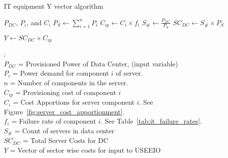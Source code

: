   \begin{algorithm}
    \caption{IT equipment Y vector algorithm}
    \begin{algorithmic}
      \REQUIRE $P_{DC}$, $P_{i}$, and $C_i$
      \STATE $P_{S} \gets \sum\limits_{i=1}^n P_{i}$
      \STATE $C_{ip} \gets C_i \times f_i$
      \STATE $S_\# \gets \frac{P_{DC}}{P_{S}}$
      \STATE $SC_{DC} \gets S_\# \times P_{S}$
      
      \vspace{.1in}
      \RETURN $Y \gets SC_{DC} \times C_{ip}$
      
      \vspace{.1in}
      : \\
        \hspace{.2in}$P_{DC}$ = Provisioned Power of Data Center, (input variable) \\
        \hspace{.2in}$P_{i}$ = Power demand for component $i$ of server.  \\
        \hspace{.2in}$n$ = Number of components in the server.  \\
        \hspace{.2in}$C_{ip}$ = Provisioning cost of component $i$ \\
        \hspace{.2in}$C_i$ = Cost Apportions for server component $i$. See Figure~\ref{fig:server_cost_apportionment}. \\
        \hspace{.2in}$f_i$ = Failure rate of component $i$. See Table~\ref{tab:it_failure_rates}. \\
        \hspace{.2in}$S_\#$ = Count of servers in data center \\
        \hspace{.2in}$SC_{DC}$ = Total Server Costs for DC \\
        \hspace{.2in}$Y$ = Vector of sector wise costs for input to USEEIO
    
    \end{algorithmic}
    \label{it_y_vector_algo}
  \end{algorithm}